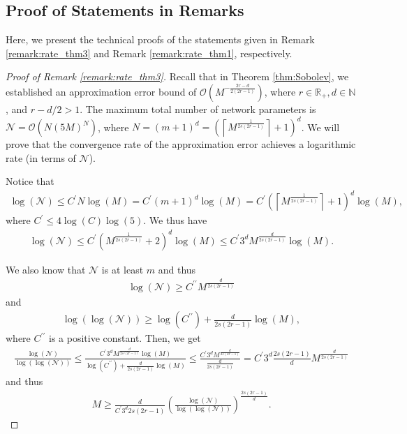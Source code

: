 \documentclass{article}
\def\NN{\mathbb N}
\def\RR{\mathbb R}
\numberwithin{equation}{section}
\begin{document}
\begin{appendices}
\section{Proof of Statements in Remarks} \label{sec:append_remark}
Here, we present the technical proofs of the statements given in Remark \ref{remark:rate_thm3} and Remark \ref{remark:rate_thm1}, respectively.


\begin{proof}[Proof of Remark \ref{remark:rate_thm3}]
Recall that in Theorem \ref{thm:Sobolev}, we established an approximation error bound of  $\mathcal{O}\left(M^{-\frac{2r-d}{2(2r-1)}}\right)$, where $r\in \RR_+, d\in \NN$, and $r-d/2 >1$. The maximum total number of network parameters is $\mathcal{N} = \mathcal{O}\left(N(5M)^N\right)$, where $N=(m+1)^d = \left(\left\lceil M^{\frac{1}{2s(2r-1)}}\right\rceil +1 \right)^d$. We will prove that the convergence rate of the approximation error achieves a logarithmic rate (in terms of $\mathcal{N}$).

Notice that
\begin{eqnarray*}
    \log (\mathcal{N}) \leq  C^\prime N \log (M) = C^\prime(m+1)^d \log (M) =  C^\prime\left(\left\lceil M^{\frac{1}{2s(2r-1)}}\right\rceil+1\right)^d \log (M),
\end{eqnarray*}
where $C^\prime\leq 4 \log (C) \log (5)$.
We thus have 
\begin{eqnarray*}
    \log (\mathcal{N}) \leq C^\prime\left(M^{\frac{1}{2s(2r-1)}}+2\right)^d \log (M) \leq C^\prime 3^d M^{\frac{d}{2s(2r-1)}}\log (M).
\end{eqnarray*}

We also know that $\mathcal{N}$ is at least $m$ and thus
\begin{eqnarray*}
    \log (\mathcal{N}) \geq C^{\prime\prime} M^{\frac{d}{2s(2r-1)}}
\end{eqnarray*}
and 
\begin{eqnarray*}
    \log(\log(\mathcal{N})) \geq \log (C^{\prime\prime})+  \frac{d}{2s(2r-1)}\log(M),
\end{eqnarray*}
where $C^{\prime\prime}$ is a positive constant. Then, we get
\begin{eqnarray*}
    \frac{\log (\mathcal{N})}{\log(\log(\mathcal{N}))} 
    \leq \frac{C^\prime 3^d M^{\frac{d}{2s(2r-1)}}\log (M)}{ \log (C^{\prime\prime})+  \frac{d}{2s(2r-1)}\log(M)} 
    \leq \frac{C^\prime 3^d M^{\frac{d}{2s(2r-1)}}}{  \frac{d}{2s(2r-1)}} = C^\prime3^d \frac{2s(2r-1)}{d}M^{\frac{d}{2s(2r-1)}}
\end{eqnarray*} and thus
\begin{eqnarray*}
    M \geq \frac{d}{C^\prime3^d2s(2r-1)}\left(\frac{\log (\mathcal{N})}{\log(\log(\mathcal{N}))}\right)^{\frac{2s(2r-1)}{d}}.
\end{eqnarray*}


\end{proof}
\end{appendices}
\end{document}
